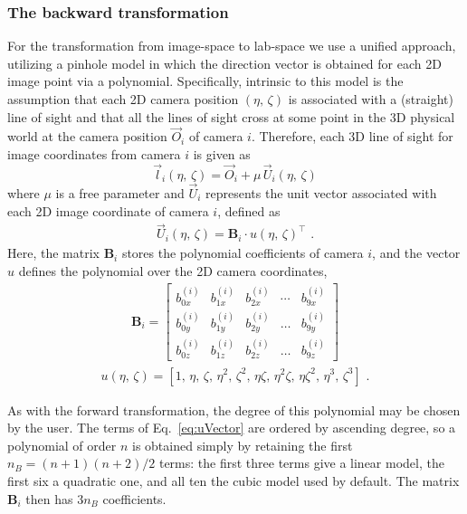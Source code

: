 \documentclass[10pt,a4paper]{article}
\begin{document}
\subsubsection{The backward transformation}
For the transformation from image-space to lab-space we use a unified approach, utilizing a pinhole model in which the direction vector is obtained for each 2D image point via a polynomial. Specifically, intrinsic to this model is the assumption that each 2D camera position $(\eta,\,\zeta)$ is associated with a (straight) line of sight and that all the lines of sight cross at some point in the 3D physical world at the camera position $\vec{O}_i$ of camera $i$. Therefore, each 3D line of sight for image coordinates from camera $i$ is given as
%
\begin{equation}
	\label{eq:losFixedOrigin}
	\vec l_i(\eta, \, \zeta) = \vec{O}_i + \mu\,\vec{U}_i(\eta, \, \zeta)
\end{equation}
%
where $\mu$ is a free parameter and $\vec{U}_i$ represents the unit vector associated with each 2D image coordinate of camera $i$, defined as
%
\begin{align}
	\label{Eq::extendedSoloff_backwards}
	\vec{U}_i(\eta, \, \zeta) = \mathbf{B}_i \cdot u(\eta, \, \zeta)^\top \,\, .
\end{align}
%
Here, the matrix $\mathbf{B}_i$ stores the polynomial coefficients of camera $i$, and the vector $u$ defines the polynomial over the 2D camera coordinates,
\begin{align}
	\mathbf{B}_i =
	\begin{bmatrix}
		b^{(i)}_{0x} & b^{(i)}_{1x} & b^{(i)}_{2x} &  \cdots & b^{(i)}_{9x}\\[2pt]
		b^{(i)}_{0y} & b^{(i)}_{1y} & b^{(i)}_{2y} &  \ldots & b^{(i)}_{9y}\\[2pt]
		b^{(i)}_{0z} & b^{(i)}_{1z} & b^{(i)}_{2z} &  \ldots & b^{(i)}_{9z}
	\end{bmatrix}
\end{align}
%
\begin{align}
	\label{eq:uVector}
	u(\eta, \, \zeta) = \left[1,\, \eta,\,  \zeta,\, \eta^2,\, \zeta^2,\, \eta \zeta,\, \eta^2 \zeta,\, \eta \zeta^2,\, \eta^3,\, \zeta^3\right] \,\, .
\end{align}

As with the forward transformation, the degree of this polynomial may be chosen by the user. The terms of Eq.~\eqref{eq:uVector} are ordered by ascending degree, so a polynomial of order $n$ is obtained simply by retaining the first $n_B = (n+1)(n+2)/2$ terms: the first three terms give a linear model, the first six a quadratic one, and all ten the cubic model used by default. The matrix $\mathbf{B}_i$ then has $3 n_B$ coefficients.
\end{document}
